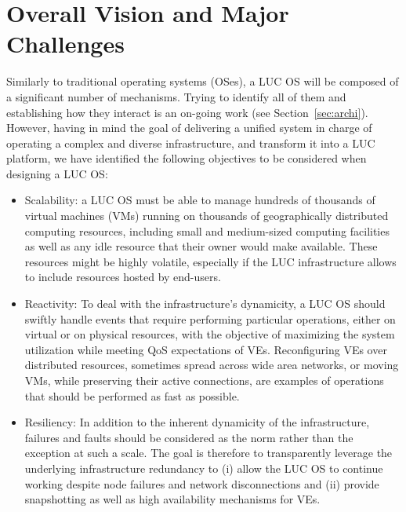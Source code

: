 \section{Overall Vision and Major Challenges\label{sec:challenges}}

Similarly to traditional operating systems (OSes), a LUC OS will be composed of a
significant number of mechanisms. Trying to identify all of them and establishing how they
interact is an on-going work (see Section~\ref{sec:archi}). However, having in
mind the goal of delivering a unified system in charge of operating a complex and diverse
infrastructure, and transform it into a LUC platform, we have identified the following
objectives to be considered when designing a LUC OS:

\begin{itemize} 
\item Scalability: a LUC OS must be able to manage hundreds of
  thousands of virtual machines (VMs) running on thousands of 
  geographically distributed computing resources, including small and
  medium-sized computing facilities as well as any idle resource that their owner would make available. These resources might be
  highly volatile, especially if the LUC infrastructure allows to include resources hosted by
  end-users.
\item Reactivity: To deal with the infrastructure's dynamicity, a LUC OS
  should swiftly handle events that require performing particular
  operations, either on virtual or on physical resources, with the
  objective of maximizing the system utilization while meeting QoS expectations of VEs. 
  Reconfiguring  VEs over distributed resources, sometimes spread across wide area networks, or moving VMs, 
  while preserving their active connections, are examples of operations that should be performed as fast as possible.
\item Resiliency: In addition to the inherent dynamicity of the
  infrastructure, failures and faults should be considered as the norm rather than the
exception at such a scale. The goal is therefore to transparently leverage the
underlying infrastructure redundancy to (i) allow the LUC OS to continue
working despite node failures and network disconnections and (ii) provide
snapshotting as well as high availability mechanisms for VEs.



\end{itemize}
